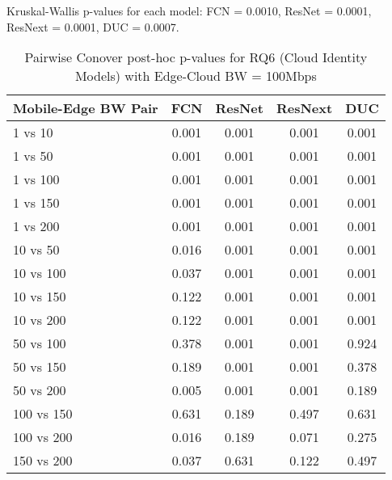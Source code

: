 \begin{table}[h]
\centering
\caption{Pairwise Conover post-hoc p-values for RQ6 (Cloud Identity Models) with Edge-Cloud BW = 100Mbps}
\label{tab:conover_cloud_identity_ec100}
\smallskip
Kruskal-Wallis p-values for each model: FCN = 0.0010, ResNet = 0.0001, ResNext = 0.0001, DUC = 0.0007.

\begin{tabular}{lcccc}
\toprule
Mobile-Edge BW Pair & FCN & ResNet & ResNext & DUC \\
\midrule
1 vs 10 & 0.001 & 0.001 & 0.001 & 0.001 \\
1 vs 50 & 0.001 & 0.001 & 0.001 & 0.001 \\
1 vs 100 & 0.001 & 0.001 & 0.001 & 0.001 \\
1 vs 150 & 0.001 & 0.001 & 0.001 & 0.001 \\
1 vs 200 & 0.001 & 0.001 & 0.001 & 0.001 \\
10 vs 50 & 0.016 & 0.001 & 0.001 & 0.001 \\
10 vs 100 & 0.037 & 0.001 & 0.001 & 0.001 \\
10 vs 150 & 0.122 & 0.001 & 0.001 & 0.001 \\
10 vs 200 & 0.122 & 0.001 & 0.001 & 0.001 \\
50 vs 100 & 0.378 & 0.001 & 0.001 & 0.924 \\
50 vs 150 & 0.189 & 0.001 & 0.001 & 0.378 \\
50 vs 200 & 0.005 & 0.001 & 0.001 & 0.189 \\
100 vs 150 & 0.631 & 0.189 & 0.497 & 0.631 \\
100 vs 200 & 0.016 & 0.189 & 0.071 & 0.275 \\
150 vs 200 & 0.037 & 0.631 & 0.122 & 0.497 \\
\bottomrule
\end{tabular}
\end{table}

